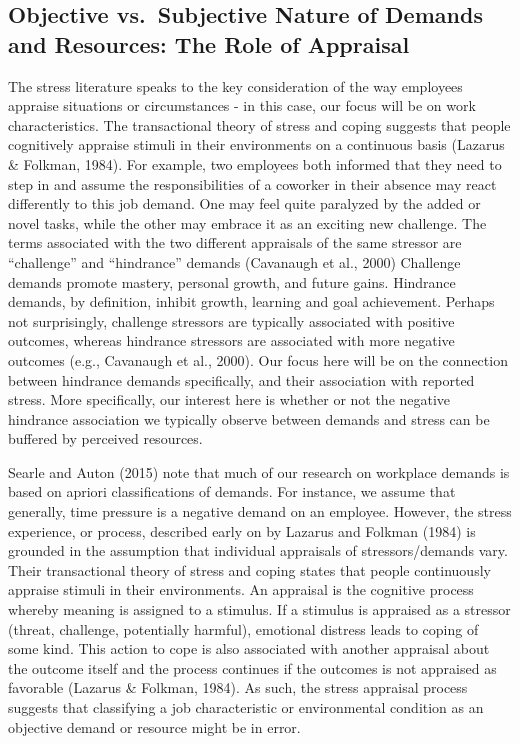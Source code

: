 \documentclass[
  man]{apa6}
\begin{document}
\hypertarget{objective-vs.-subjective-nature-of-demands-and-resources-the-role-of-appraisal}{%
\subsection{Objective vs.~Subjective Nature of Demands and Resources: The Role of Appraisal}\label{objective-vs.-subjective-nature-of-demands-and-resources-the-role-of-appraisal}}

The stress literature speaks to the key consideration of the way employees appraise situations or circumstances - in this case, our focus will be on work characteristics. The transactional theory of stress and coping suggests that people cognitively appraise stimuli in their environments on a continuous basis (Lazarus \& Folkman, 1984). For example, two employees both informed that they need to step in and assume the responsibilities of a coworker in their absence may react differently to this job demand. One may feel quite paralyzed by the added or novel tasks, while the other may embrace it as an exciting new challenge. The terms associated with the two different appraisals of the same stressor are ``challenge'' and ``hindrance'' demands (Cavanaugh et al., 2000) Challenge demands promote mastery, personal growth, and future gains. Hindrance demands, by definition, inhibit growth, learning and goal achievement. Perhaps not surprisingly, challenge stressors are typically associated with positive outcomes, whereas hindrance stressors are associated with more negative outcomes (e.g., Cavanaugh et al., 2000). Our focus here will be on the connection between hindrance demands specifically, and their association with reported stress. More specifically, our interest here is whether or not the negative hindrance association we typically observe between demands and stress can be buffered by perceived resources.

Searle and Auton (2015) note that much of our research on workplace demands is based on apriori classifications of demands. For instance, we assume that generally, time pressure is a negative demand on an employee. However, the stress experience, or process, described early on by Lazarus and Folkman (1984) is grounded in the assumption that individual appraisals of stressors/demands vary. Their transactional theory of stress and coping states that people continuously appraise stimuli in their environments. An appraisal is the cognitive process whereby meaning is assigned to a stimulus. If a stimulus is appraised as a stressor (threat, challenge, potentially harmful), emotional distress leads to coping of some kind. This action to cope is also associated with another appraisal about the outcome itself and the process continues if the outcomes is not appraised as favorable (Lazarus \& Folkman, 1984). As such, the stress appraisal process suggests that classifying a job characteristic or environmental condition as an objective demand or resource might be in error.
\end{document}
